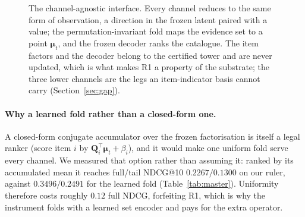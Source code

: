 \documentclass[acmsmall,review,anonymous]{acmart}
\newcommand{\R}{\mathbb{R}}
\newcommand{\Q}{\mathbf{Q}}
\newcommand{\bphi}{\boldsymbol{\phi}}
\newcommand{\bmu}{\boldsymbol{\mu}}
\begin{document}
\begin{figure}[t]
\centering
{}
\caption{The channel-agnostic interface. Every channel reduces to the same form of observation, a direction in the frozen latent paired with a value; the permutation-invariant fold maps the evidence set to a point $\bmu_t$, and the frozen decoder ranks the catalogue. The item factors and the decoder belong to the certified tower and are never updated, which is what makes R1 a property of the substrate; the three lower channels are the legs an item-indicator basis cannot carry (Section~\ref{sec:gap}).}
\label{fig:architecture}
\end{figure}

\paragraph{Why a learned fold rather than a closed-form one.} A closed-form conjugate accumulator over the frozen factorisation is itself a legal ranker (score item $i$ by $\Q_i^\top\bmu_t+\beta_i$), and it would make one uniform fold serve every channel. We measured that option rather than assuming it: ranked by its accumulated mean it reaches full/tail NDCG@10 $0.2267/0.1300$ on our ruler, against $0.3496/0.2491$ for the learned fold (Table~\ref{tab:master}). Uniformity therefore costs roughly $0.12$ full NDCG, forfeiting R1, which is why the instrument folds with a learned set encoder and pays for the extra operator.
\end{document}
